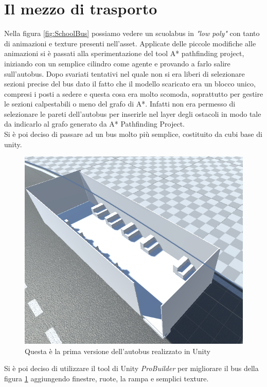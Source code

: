 \documentclass[12pt, openany]{book}
\begin{document}
	\section{Il mezzo di trasporto}
	Nella figura \ref{fig:SchoolBus} possiamo vedere un scuolabus in \emph{"low poly"} con tanto di animazioni e texture presenti nell'asset. Applicate delle piccole modifiche alle animazioni si è passati alla sperimentazione del tool A* pathfinding project, iniziando con un semplice cilindro come agente e provando a farlo salire sull'autobus. Dopo svariati tentativi nel quale non si era liberi di selezionare sezioni precise del bus dato il fatto che il modello scaricato era un blocco unico, compresi i posti a sedere e questa cosa era molto scomoda, soprattutto per gestire le sezioni calpestabili o meno del grafo di A*. Infatti non era permesso di selezionare le pareti dell'autobus per inserirle nel layer degli ostacoli in modo tale da indicarlo al grafo generato da A* Pathfinding Project.\\
	Si è poi deciso di passare ad un bus molto più semplice, costituito da cubi base di unity.
	\begin{figure}[H]
		\centering
		\includegraphics[width=0.8\linewidth]{"Immagini/AutobusBase.png"}
		\caption{Questa è la prima versione dell'autobus realizzato in Unity}
		\label{fig:AutobusBase}
	\end{figure}
	Si è poi deciso di utilizzare il tool di Unity \emph{ProBuilder} per migliorare il bus della figura \ref{fig:AutobusBase} aggiungendo finestre, ruote, la rampa e semplici texture.
\end{document}
